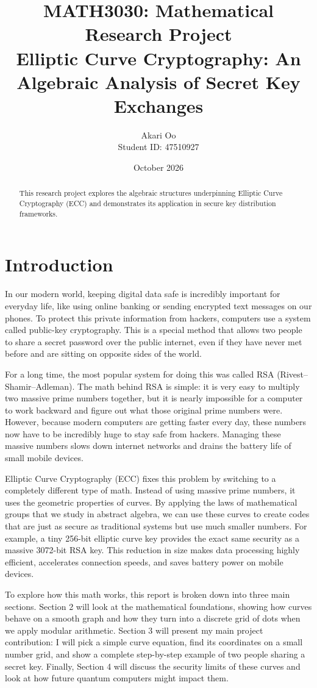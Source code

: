 \documentclass[11pt,a4paper]{article}
\title{MATH3030: Mathematical Research Project \\[0.5em]
\large Elliptic Curve Cryptography: An Algebraic Analysis of Secret Key Exchanges}
\author{Akari Oo \\ \small Student ID: 47510927}
\date{October 2026}
\begin{document}
\maketitle

\begin{abstract}
This research project explores the algebraic structures underpinning Elliptic Curve Cryptography (ECC) and demonstrates its application in secure key distribution frameworks. 
\end{abstract}

\newpage

\section{Introduction}
In our modern world, keeping digital data safe is incredibly important for everyday life, like using online banking or sending encrypted text messages on our phones. To protect this private information from hackers, computers use a system called public-key cryptography. This is a special method that allows two people to share a secret password over the public internet, even if they have never met before and are sitting on opposite sides of the world. 

For a long time, the most popular system for doing this was called RSA (Rivest--Shamir--Adleman). The math behind RSA is simple: it is very easy to multiply two massive prime numbers together, but it is nearly impossible for a computer to work backward and figure out what those original prime numbers were. However, because modern computers are getting faster every day, these numbers now have to be incredibly huge to stay safe from hackers. Managing these massive numbers slows down internet networks and drains the battery life of small mobile devices.

Elliptic Curve Cryptography (ECC) fixes this problem by switching to a completely different type of math. Instead of using massive prime numbers, it uses the geometric properties of curves. By applying the laws of mathematical groups that we study in abstract algebra, we can use these curves to create codes that are just as secure as traditional systems but use much smaller numbers. For example, a tiny 256-bit elliptic curve key provides the exact same security as a massive 3072-bit RSA key. This reduction in size makes data processing highly efficient, accelerates connection speeds, and saves battery power on mobile devices.

To explore how this math works, this report is broken down into three main sections. Section 2 will look at the mathematical foundations, showing how curves behave on a smooth graph and how they turn into a discrete grid of dots when we apply modular arithmetic. Section 3 will present my main project contribution: I will pick a simple curve equation, find its coordinates on a small number grid, and show a complete step-by-step example of two people sharing a secret key. Finally, Section 4 will discuss the security limits of these curves and look at how future quantum computers might impact them.
\end{document}
